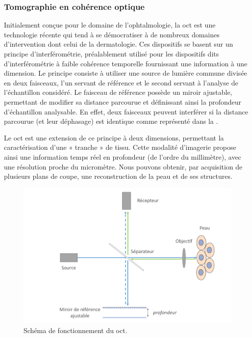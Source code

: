 \subsubsection{Tomographie en cohérence optique}
Initialement conçue pour le domaine de l’ophtalmologie, la \gls{oct} est une technologie récente qui tend à se démocratiser à de nombreux domaines d’intervention dont celui de la dermatologie. Ces dispositifs se basent sur un principe d’interférométrie, préalablement utilisé pour les dispositifs dits d’interférométrie à faible cohérence temporelle fournissant une information à une dimension. Le principe consiste à utiliser une source de lumière commune divisée en deux faisceaux, l’un servant de référence et le second servant à l’analyse de l’échantillon considéré. Le faisceau de référence possède un miroir ajustable, permettant de modifier sa distance parcourue et définissant ainsi la profondeur d’échantillon analysable. En effet, deux faisceaux peuvent interférer si la distance parcourue (et leur déphasage) est identique comme représenté dans la .\par

Le \gls{oct} est une extension de ce principe à deux dimensions, permettant la caractérisation d’une « tranche » de tissu. Cette modalité d’imagerie propose ainsi une information temps réel en profondeur (de l’ordre du millimètre), avec une résolution proche du micromètre. Nous pouvons obtenir, par acquisition de plusieurs plans de coupe, une reconstruction de la peau et de ses structures.\par

\begin{figure}[H]
    \centering
    \includegraphics[width=0.8\linewidth]{contents/chapter_2/resources/scheme_principle_oct.pdf}
    \caption{Schéma de fonctionnement du \gls{oct}.}
    \label{fig:scheme_principle_oct}
\end{figure}\par

